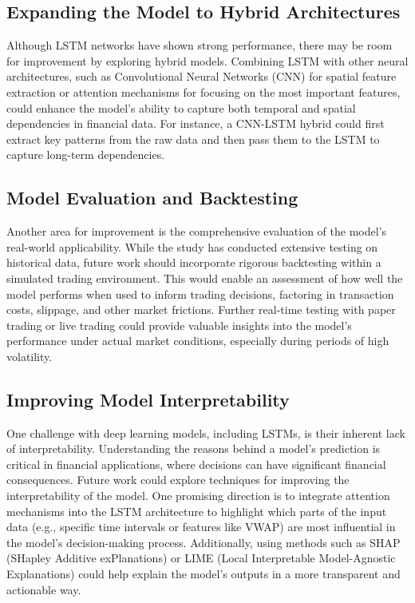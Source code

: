 \documentclass[letterpaper]{article}
\begin{document}
\subsection{Expanding the Model to Hybrid Architectures}
Although LSTM networks have shown strong performance, there may be room for improvement by exploring hybrid models. Combining LSTM with other neural architectures, such as Convolutional Neural Networks (CNN) for spatial feature extraction or attention mechanisms for focusing on the most important features, could enhance the model’s ability to capture both temporal and spatial dependencies in financial data. For instance, a CNN-LSTM hybrid could first extract key patterns from the raw data and then pass them to the LSTM to capture long-term dependencies.

\subsection{Model Evaluation and Backtesting}
Another area for improvement is the comprehensive evaluation of the model’s real-world applicability. While the study has conducted extensive testing on historical data, future work should incorporate rigorous backtesting within a simulated trading environment. This would enable an assessment of how well the model performs when used to inform trading decisions, factoring in transaction costs, slippage, and other market frictions. Further real-time testing with paper trading or live trading could provide valuable insights into the model’s performance under actual market conditions, especially during periods of high volatility.

\subsection{Improving Model Interpretability}
One challenge with deep learning models, including LSTMs, is their inherent lack of interpretability. Understanding the reasons behind a model’s prediction is critical in financial applications, where decisions can have significant financial consequences. Future work could explore techniques for improving the interpretability of the model. One promising direction is to integrate attention mechanisms into the LSTM architecture to highlight which parts of the input data (e.g., specific time intervals or features like VWAP) are most influential in the model’s decision-making process. Additionally, using methods such as SHAP (SHapley Additive exPlanations) or LIME (Local Interpretable Model-Agnostic Explanations) could help explain the model's outputs in a more transparent and actionable way.
\end{document}
